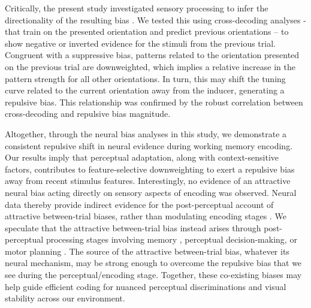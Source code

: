 \documentclass{article}
\begin{document}
\begin{large}
Critically, the present study investigated sensory processing to infer the directionality of the resulting bias \parencite{Wolff2020}. We tested this using cross-decoding analyses - that train on the presented orientation and predict previous orientations – to show negative or inverted evidence for the stimuli from the previous trial. Congruent with a suppressive bias, patterns related to the orientation presented on the previous trial are downweighted, which implies a relative increase in the pattern strength for all other orientations. In turn, this may shift the tuning curve related to the current orientation away from the inducer, generating a repulsive bias. This relationship was confirmed by the robust correlation between cross-decoding and repulsive bias magnitude.

Altogether, through the neural bias analyses in this study, we demonstrate a consistent repulsive shift in neural evidence during working memory encoding. Our results imply that perceptual adaptation, along with context-sensitive factors, contributes to feature-selective downweighting to exert a repulsive bias away from recent stimulus features. Interestingly, no evidence of an attractive neural bias acting directly on sensory aspects of encoding was observed. Neural data thereby provide indirect evidence for the post-perceptual account of attractive between-trial biases, rather than modulating encoding stages \parencite{Fritsche2017, Bliss2017, Bae2020, Kim2020, Pascucci2019}. We speculate that the attractive between-trial bias instead arises through post-perceptual processing stages involving memory \parencite{Fritsche2017, Bliss2017}, perceptual decision-making, or motor planning \parencite{Machado2021, Sadil2021, Boettcher2021} . The source of the attractive between-trial bias, whatever its neural mechanism, may be strong enough to overcome the repulsive bias that we see during the perceptual/encoding stage. Together, these co-existing biases may help guide efficient coding for nuanced perceptual discriminations and visual stability across our environment.  

\end{large}
\end{document}
